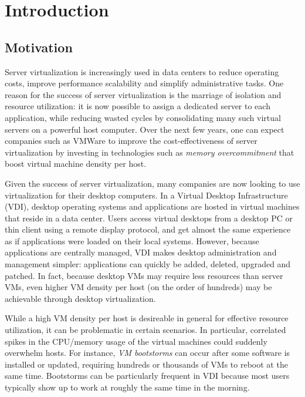 \chapter{Introduction}
\section{Motivation}
Server virtualization is increasingly used in data centers to 
reduce operating costs, improve performance scalability and 
simplify administrative tasks. One reason for the success of
server virtualization is the marriage of isolation and resource 
utilization: it is now possible to assign a dedicated server 
to each application, while reducing wasted cycles by consolidating 
many such virtual servers on a powerful host computer. Over
the next few years, one can expect companies such as VMWare 
to improve the cost-effectiveness of server virtualization by
investing in technologies such as \emph{memory overcommitment} 
that boost virtual machine density per host.

Given the success of server virtualization, many companies are now  
looking to use virtualization for their desktop computers.
In a Virtual Desktop Infrastructure (VDI), desktop operating systems 
and applications are hosted in virtual machines that reside in a data 
center. Users access virtual desktops from a desktop PC or
thin client using a remote display protocol, and get almost the
same experience as if applications were loaded on their local systems.
However, because applications are centrally managed, 
VDI makes desktop administration and management simpler: applications
can quickly be added, deleted, upgraded and patched. 
In fact, because desktop VMs may require less resources than 
server VMs, even higher VM density per host (on the order of 
hundreds) may be achievable through desktop virtualization.

While a high VM density per host is desireable in general for
effective resource utilization, it can be problematic
in certain scenarios. In particular, correlated spikes
in the CPU/memory usage of the virtual machines could suddenly overwhelm hosts.
For instance, \emph{VM bootstorms} can occur after some software is installed
or updated, requiring hundreds or thousands of VMs to reboot at the same time.
Bootstorms can be particularly frequent in VDI because 
most users typically show up to work at roughly the same time
in the morning. 

